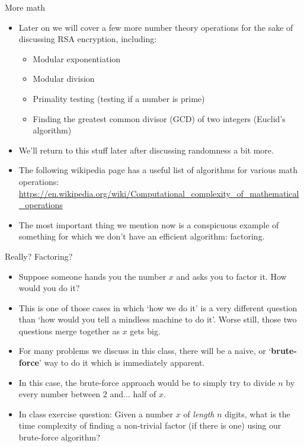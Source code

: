 \documentclass{beamer}
\begin{document}
\begin{frame}{More math}
    \begin{itemize}
        \item Later on we will cover a few more number theory operations for the sake of discussing RSA encryption, including:
        \begin{itemize}
            \item Modular exponentiation
            \item Modular division
            \item Primality testing (testing if a number is prime)
            \item Finding the greatest common divisor (GCD) of two integers (Euclid's algorithm)
        \end{itemize}
        \item We'll return to this stuff later after discussing randomness a bit more.
        \item The following wikipedia page has a useful list of algorithms for various math operations: \url{https://en.wikipedia.org/wiki/Computational_complexity_of_mathematical_operations}
        \item The most important thing we mention now is a conspicuous example of something for which we don't have an efficient algorithm: factoring.
    \end{itemize}
\end{frame}

\begin{frame}{Really? Factoring?}
    \begin{itemize}
        \item Suppose someone hands you the number $x$ and asks you to factor it. How would you do it?
        \pause 
        \item This is one of those cases in which `how we do it' is a very different question than `how would you tell a mindless machine to do it'. Worse still, those two questions merge together as $x$ gets big. 
        \item For many problems we discuss in this class, there will be a naive, or `\textbf{brute-force}' way to do it which is immediately apparent. 
        \pause
        \item In this case, the brute-force approach would be to simply try to divide $n$ by every number between $2$ and... half of $x$. 
        \item In class exercise question: Given a number $x$ of \emph{length} $n$ digits, what is the time complexity of finding a non-trivial factor (if there is one) using our brute-force algorithm?
    \end{itemize}
\end{frame}
\end{document}
